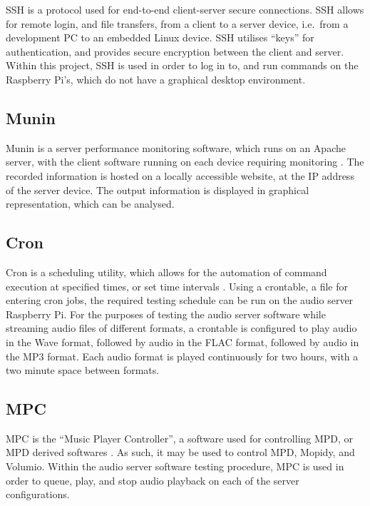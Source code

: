 \documentclass[11pt,a4paper,headinclude=false,footinclude=false]{scrreprt}
\begin{document}
SSH is a protocol used for end-to-end client-server secure
connections\cite{ssh}. SSH allows for remote login, and file transfers,
from a client to a server device, i.e.~from a development PC to an
embedded Linux device. SSH utilises ``keys'' for authentication, and
provides secure encryption between the client and server. Within this
project, SSH is used in order to log in to, and run commands on the
Raspberry Pi's, which do not have a graphical desktop environment.

\subsection{Munin}\label{munin}

Munin is a server performance monitoring software, which runs on an
Apache server, with the client software running on each device requiring
monitoring \cite{MuninMonitoring}. The recorded information is hosted on
a locally accessible website, at the IP address of the server device.
The output information is displayed in graphical representation, which
can be analysed.

\subsection{Cron}\label{cron}

Cron is a scheduling utility, which allows for the automation of command
execution at specified times, or set time intervals \cite{crontab}.
Using a crontable, a file for entering cron jobs, the required testing
schedule can be run on the audio server Raspberry Pi. For the purposes
of testing the audio server software while streaming audio files of
different formats, a crontable is configured to play audio in the Wave
format, followed by audio in the FLAC format, followed by audio in the
MP3 format. Each audio format is played continuously for two hours, with
a two minute space between formats.

\subsection{MPC}\label{mpc}

MPC is the ``Music Player Controller'', a software used for controlling
MPD, or MPD derived softwares \cite{mpc}. As such, it may be used to
control MPD, Mopidy, and Volumio. Within the audio server software
testing procedure, MPC is used in order to queue, play, and stop audio
playback on each of the server configurations.
\end{document}
